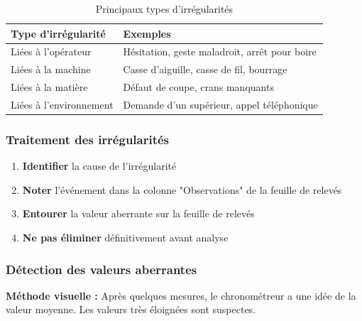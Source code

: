 \documentclass[a4paper,12pt]{article}
\begin{document}
\begin{table}[ht]
\centering
\begin{tabular}{|p{5cm}|p{9cm}|}
\hline
\textbf{Type d'irrégularité} & \textbf{Exemples} \\
\hline
Liées à l'opérateur & Hésitation, geste maladroit, arrêt pour boire \\
Liées à la machine & Casse d'aiguille, casse de fil, bourrage \\
Liées à la matière & Défaut de coupe, crans manquants \\
Liées à l'environnement & Demande d'un supérieur, appel téléphonique \\
\hline
\end{tabular}
\caption{Principaux types d'irrégularités}
\end{table}

\subsubsection{Traitement des irrégularités}

\begin{enumerate}
    \item \textbf{Identifier} la cause de l'irrégularité
    \item \textbf{Noter} l'événement dans la colonne "Observations" de la feuille de relevés
    \item \textbf{Entourer} la valeur aberrante sur la feuille de relevés
    \item \textbf{Ne pas éliminer} définitivement avant analyse
\end{enumerate}

\begin{center}
\end{center}

\subsubsection{Détection des valeurs aberrantes}

\textbf{Méthode visuelle :} Après quelques mesures, le chronométreur a une idée de la valeur moyenne. Les valeurs très éloignées sont suspectes.
\end{document}
